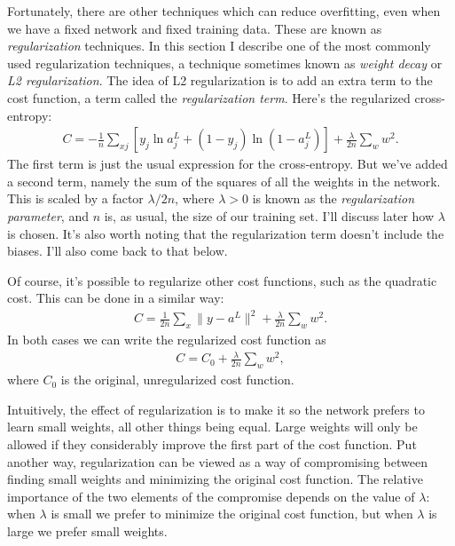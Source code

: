 \documentclass[a4paper,twoside,10pt]{book}
\begin{document}
Fortunately, there are other techniques which can reduce overfitting, even when we have a fixed network and fixed training data. These are known as \textit{regularization} techniques. In this section I describe one of the most commonly used regularization techniques, a technique sometimes known as \textit{weight decay} or \textit{L2 regularization}. The idea of L2 regularization is to add an extra term to the cost function, a term called the \textit{regularization term}. Here's the regularized cross-entropy:
\begin{eqnarray}
C = -\frac{1}{n} \sum_{xj} \left[ y_j \ln a^L_j+(1-y_j) \ln (1-a^L_j)\right] + \frac{\lambda}{2n} \sum_w w^2.
\label{eq:85}
\end{eqnarray}
The first term is just the usual expression for the cross-entropy. But we've added a second term, namely the sum of the squares of all the weights in the network. This is scaled by a factor $\lambda/2n$, where $\lambda>0$ is known as the \textit{regularization parameter}, and $n$ is, as usual, the size of our training set. I'll discuss later how $\lambda$ is chosen. It's also worth noting that the regularization term doesn't include the biases. I'll also come back to that below.

Of course, it's possible to regularize other cost functions, such as the quadratic cost. This can be done in a similar way:
\begin{eqnarray} C = \frac{1}{2n} \sum_x \|y-a^L\|^2 + \frac{\lambda}{2n} \sum_w w^2.
\label{eq:86}\end{eqnarray}
In both cases we can write the regularized cost function as
\begin{eqnarray}  C = C_0 + \frac{\lambda}{2n}\sum_w w^2,
\label{eq:87}
\end{eqnarray}
where $C_0$ is the original, unregularized cost function.

Intuitively, the effect of regularization is to make it so the network prefers to learn small weights, all other things being equal. Large weights will only be allowed if they considerably improve the first part of the cost function. Put another way, regularization can be viewed as a way of compromising between finding small weights and minimizing the original cost function. The relative importance of the two elements of the compromise depends on the value of $\lambda$: when $\lambda$  is small we prefer to minimize the original cost function, but when $\lambda$ is large we prefer small weights.
\end{document}
